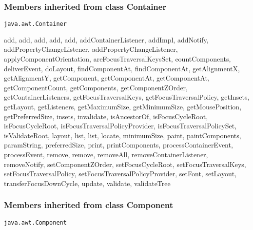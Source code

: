 {{{{{{{{{{{{{{{{{\subsubsection{Members inherited from class Container }{
\texttt{java.awt.Container} {\small 
{}}
{\small 

add, add, add, add, add, addContainerListener, addImpl, addNotify, addPropertyChangeListener, addPropertyChangeListener, applyComponentOrientation, areFocusTraversalKeysSet, countComponents, deliverEvent, doLayout, findComponentAt, findComponentAt, getAlignmentX, getAlignmentY, getComponent, getComponentAt, getComponentAt, getComponentCount, getComponents, getComponentZOrder, getContainerListeners, getFocusTraversalKeys, getFocusTraversalPolicy, getInsets, getLayout, getListeners, getMaximumSize, getMinimumSize, getMousePosition, getPreferredSize, insets, invalidate, isAncestorOf, isFocusCycleRoot, isFocusCycleRoot, isFocusTraversalPolicyProvider, isFocusTraversalPolicySet, isValidateRoot, layout, list, list, locate, minimumSize, paint, paintComponents, paramString, preferredSize, print, printComponents, processContainerEvent, processEvent, remove, remove, removeAll, removeContainerListener, removeNotify, setComponentZOrder, setFocusCycleRoot, setFocusTraversalKeys, setFocusTraversalPolicy, setFocusTraversalPolicyProvider, setFont, setLayout, transferFocusDownCycle, update, validate, validateTree}
\subsubsection{Members inherited from class Component }{
\texttt{java.awt.Component} {\small 
{}}
{\small 

}}}}}}}}}}}}}}}}}}}}
